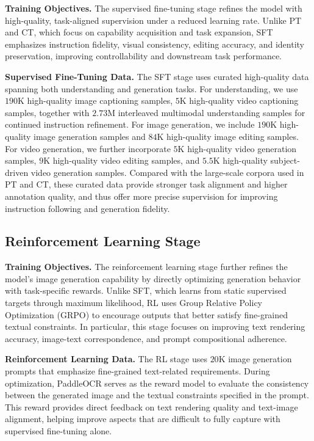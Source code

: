 \documentclass{llmxive}
\begin{document}
\textbf{Training Objectives.}
The supervised fine-tuning stage refines the model with high-quality, task-aligned supervision under a reduced learning rate. Unlike PT and CT, which focus on capability acquisition and task expansion, SFT emphasizes instruction fidelity, visual consistency, editing accuracy, and identity preservation, improving controllability and downstream task performance.




\textbf{Supervised Fine-Tuning Data.}
The SFT stage uses curated high-quality data spanning both understanding and generation tasks. For understanding, we use $190$K high-quality image captioning samples, $5$K high-quality video captioning samples, together with $2.73$M interleaved multimodal understanding samples for continued instruction refinement. For image generation, we include $190$K high-quality image generation samples and $84$K high-quality image editing samples. For video generation, we further incorporate $5$K high-quality video generation samples, $9$K high-quality video editing samples, and $5.5$K high-quality subject-driven video generation samples. Compared with the large-scale corpora used in PT and CT, these curated data provide stronger task alignment and higher annotation quality, and thus offer more precise supervision for improving instruction following and generation fidelity.




\subsection{Reinforcement Learning Stage}

\textbf{Training Objectives.}
The reinforcement learning stage further refines the model's image generation capability by directly optimizing generation behavior with task-specific rewards. Unlike SFT, which learns from static supervised targets through maximum likelihood, RL uses Group Relative Policy Optimization (GRPO) to encourage outputs that better satisfy fine-grained textual constraints. In particular, this stage focuses on improving text rendering accuracy, image-text correspondence, and prompt compositional adherence.

\textbf{Reinforcement Learning Data.}
The RL stage uses $20$K image generation prompts that emphasize fine-grained text-related requirements. During optimization, PaddleOCR \cite{cui2025paddleocr} serves as the reward model to evaluate the consistency between the generated image and the textual constraints specified in the prompt. This reward provides direct feedback on text rendering quality and text-image alignment, helping improve aspects that are difficult to fully capture with supervised fine-tuning alone.
\end{document}
